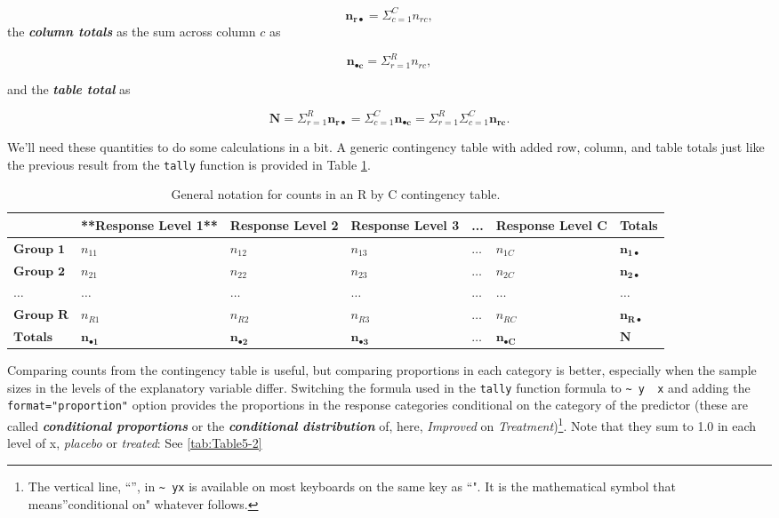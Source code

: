 \documentclass[]{book}
\let\rmarkdownfootnote\footnote%
\def\footnote{\protect\rmarkdownfootnote}
\theoremstyle{definition}
\theoremstyle{definition}
\theoremstyle{remark}
\begin{document}
\[\mathbf{n_{r\bullet}}=\Sigma^C_{c=1}n_{rc},\] the \textbf{\emph{column
totals}} as the sum across column \(c\) as

\[\mathbf{n_{\bullet c}}=\Sigma^R_{r=1}n_{rc},\]

and the \textbf{\emph{table total}} as

\[\mathbf{N}=\Sigma^R_{r=1}\mathbf{n_{r\bullet}} = \Sigma^C_{c=1}\mathbf{n_{\bullet c}}
= \Sigma^R_{r=1}\Sigma^C_{c=1}\mathbf{n_{rc}}.\]

We'll need these quantities to do some calculations in a bit. A generic
contingency table with added row, column, and table totals just like the
previous result from the \texttt{tally} function is provided in Table
\ref{tab:Table5-1}.



\begin{table}

\caption{\label{tab:Table5-1}General notation for counts in an R by C contingency table.}
\centering
\begin{tabular}[t]{l|l|l|l|l|l|l}
\hline
 & **Response Level 1** & Response Level 2 & Response Level 3 & ... & Response Level C & Totals\\
\hline
$\textbf{Group 1}$ & $n_{11}$ & $n_{12}$ & $n_{13}$ & $\ldots$ & $n_{1C}$ & $\mathbf{n_{1\bullet}}$\\
\hline
$\textbf{Group 2}$ & $n_{21}$ & $n_{22}$ & $n_{23}$ & $\ldots$ & $n_{2C}$ & $\mathbf{n_{2\bullet}}$\\
\hline
$\mathbf{\ldots}$ & $\ldots$ & $\ldots$ & $\ldots$ & $\ldots$ & $\ldots$ & $\mathbf{\ldots}$\\
\hline
$\textbf{Group R}$ & $n_{R1}$ & $n_{R2}$ & $n_{R3}$ & $\ldots$ & $n_{RC}$ & $\mathbf{n_{R\bullet}}$\\
\hline
$\textbf{Totals}$ & $\mathbf{n_{\bullet 1}}$ & $\mathbf{n_{\bullet 2}}$ & $\mathbf{n_{\bullet 3}}$ & $\mathbf{\ldots}$ & $\mathbf{n_{\bullet C}}$ & $\mathbf{N}$\\
\hline
\end{tabular}
\end{table}

Comparing counts from the contingency table is useful, but comparing
proportions in each category is better, especially when the sample sizes
in the levels of the explanatory variable differ. Switching the formula
used in the \texttt{tally} function formula to
\texttt{\textasciitilde{}\ y\ \textbar{}\ x} and adding the
\texttt{format="proportion"} option provides the proportions in the
response categories conditional on the category of the predictor (these
are called \textbf{\emph{conditional proportions}} or the
\textbf{\emph{conditional distribution}} of, here, \emph{Improved} on
\emph{Treatment})\footnote{The vertical line, ``\texttt{\textbar{}}'',
  in \texttt{\textasciitilde{}\ y\textbar{}x} is available on most
  keyboards on the same key as ``". It is the mathematical symbol that
  means''conditional on" whatever follows.}. Note that they sum to 1.0
in each level of x, \emph{placebo} or \emph{treated}: See
\ref{tab:Table5-2}
\end{document}
